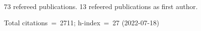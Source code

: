 73 refereed publications. 13 refeered publications as first author.

Total citations~=~2711; h-index~=~27 (2022-07-18)